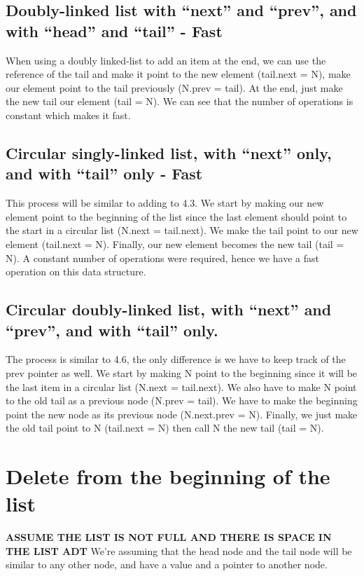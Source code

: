 \documentclass{article}
\begin{document}
\subsection{Doubly-linked list with “next” and “prev”, and with “head” and “tail” - Fast}
When using a doubly linked-list to add an item at the end, we can use the reference of the tail and make it point to the new element (tail.next = N), make our element point to the tail previously (N.prev = tail). At the end, just make the new tail our element (tail = N). We can see that the number of operations is constant which makes it fast.

\subsection{Circular singly-linked list, with “next” only, and with “tail” only - Fast}
This process will be similar to adding to 4.3. We start by making our new element point to the beginning of the list since the last element should point to the start in a circular list (N.next = tail.next). We make the tail point to our new element (tail.next = N). Finally, our new element becomes the new tail (tail = N). A constant number of operations were required, hence we have a fast operation on this data structure.


\subsection{Circular doubly-linked list, with “next” and “prev”, and with “tail” only.}
The process is similar to 4.6, the only difference is we have to keep track of the prev pointer as well. We start by making N point to the beginning since it will be the last item in a circular list (N.next = tail.next). We also have to make N point to the old tail as a previous node (N.prev = tail). We have to make the beginning point the new node as its previous node (N.next.prev = N). Finally, we just make the old tail point to N (tail.next = N) then call N the new tail (tail = N).



\section{Delete from the beginning of the list}
\textbf{ASSUME THE LIST IS NOT FULL AND THERE IS SPACE IN THE LIST ADT}
We're assuming that the head node and the tail node will be similar to any other node, and have a value and a pointer to another node.
\end{document}

